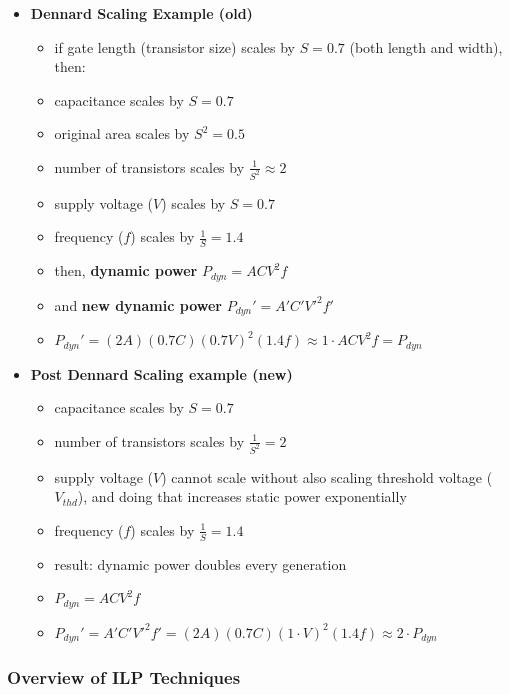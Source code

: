 \documentclass[12pt]{extarticle}
\begin{document}
\begin{itemize}
        \item \textbf{Dennard Scaling Example (old)}
        \begin{itemize}
            \item if gate length (transistor size) scales by $S = 0.7$ (both length and width), then:
            \item capacitance scales by $S = 0.7$
            \item original area scales by $S^2 = 0.5$
            \item number of transistors scales by $\frac{1}{S^2} \approx 2$
            \item supply voltage ($V$) scales by $S = 0.7$
            \item frequency ($f$) scales by $\frac{1}{S} = 1.4$
            \item then, \textbf{dynamic power} $P_{dyn} = ACV^2f$
            \item and \textbf{new dynamic power} $P_{dyn}' = A'C'V'^2f'$
            \item $P_{dyn}' = (2A)(0.7C)(0.7V)^2(1.4f) \approx 1 \cdot ACV^2f = P_{dyn}$
        \end{itemize}

        \item \textbf{Post Dennard Scaling example (new)}
        \begin{itemize}
            \item capacitance scales by $S = 0.7$
            \item number of transistors scales by $\frac{1}{S^2} = 2$
            \item supply voltage ($V$) cannot scale without also scaling threshold voltage ($V_{thd}$), and doing that 
            increases static power exponentially
            \item frequency ($f$) scales by $\frac{1}{S} = 1.4$
            \item result: dynamic power doubles every generation
            \item $P_{dyn} = ACV^2f$
            \item $P_{dyn}' = A'C'V'^2f' = (2A)(0.7C)(1 \cdot V)^2(1.4f) \approx 2 \cdot P_{dyn}$
        \end{itemize}

    \end{itemize}

	\subsubsection{Overview of ILP Techniques}
\end{document}
